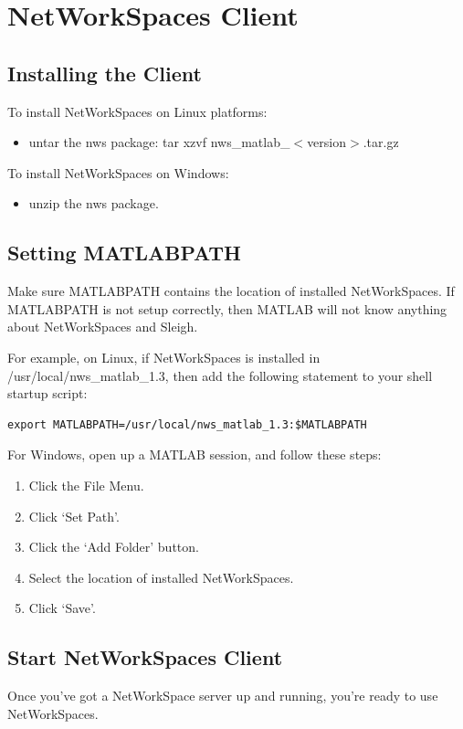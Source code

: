 \section{NetWorkSpaces Client}
\subsection{Installing the Client}
To install NetWorkSpaces on Linux platforms:

\begin{itemize}
\item untar the nws package: tar xzvf nws\_matlab\_$<$version$>$.tar.gz
\end{itemize}

To install NetWorkSpaces on Windows:

\begin{itemize}
\item unzip the nws package.
\end{itemize}

\subsection{Setting MATLABPATH}
Make sure MATLABPATH contains the location of installed NetWorkSpaces.
If MATLABPATH is not setup correctly, then MATLAB will not know anything about NetWorkSpaces and Sleigh.

For example, on Linux, if NetWorkSpaces is installed in
/usr/local/nws\_matlab\_1.3, then add the following statement to your
shell startup script:

\begin{verbatim}
export MATLABPATH=/usr/local/nws_matlab_1.3:$MATLABPATH
\end{verbatim}

For Windows, open up a MATLAB session, and follow these steps:

\begin{enumerate}
\item Click the File Menu.
\item Click `Set Path'.
\item Click the `Add Folder' button.
\item Select the location of installed NetWorkSpaces.
\item Click `Save'.
\end{enumerate}

\subsection{Start NetWorkSpaces Client}
Once you've got a NetWorkSpace server up and running, you're ready to use NetWorkSpaces.


